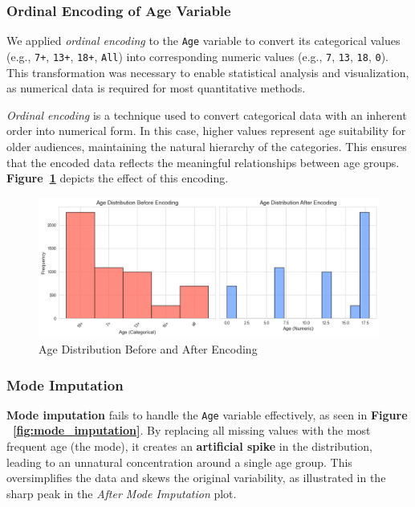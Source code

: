 \documentclass[a4paper, 12pt]{article}
\begin{document}
\subsubsection{Ordinal Encoding of Age Variable}

We applied \textit{ordinal encoding} to the \texttt{Age} variable to convert its categorical values (e.g., \texttt{7+}, \texttt{13+}, \texttt{18+}, \texttt{All}) into corresponding numeric values (e.g., \texttt{7}, \texttt{13}, \texttt{18}, \texttt{0}). This transformation was necessary to enable statistical analysis and visualization, as numerical data is required for most quantitative methods.

\textit{Ordinal encoding} is a technique used to convert categorical data with an inherent order into numerical form. In this case, higher values represent age suitability for older audiences, maintaining the natural hierarchy of the categories. \cite{von_eye1996categorical} This ensures that the encoded data reflects the meaningful relationships between age groups. \textbf{Figure~\ref{fig:age_encoding}} depicts the effect of this encoding.

\begin{figure}[H]
    \centering
    \includegraphics[width=\textwidth]{encode_age.png} %
    \caption{Age Distribution Before and After Encoding}
    \label{fig:age_encoding}
\end{figure}

\subsubsection{Mode Imputation}

\textbf{Mode imputation} fails to handle the \texttt{Age} variable effectively, as seen in \textbf{Figure ~\ref{fig:mode_imputation}}. By replacing all missing values with the most frequent age (the mode), it creates an \textbf{artificial spike} in the distribution, leading to an unnatural concentration around a single age group. This oversimplifies the data and skews the original variability, as illustrated in the sharp peak in the \textit{After Mode Imputation} plot.
\end{document}

